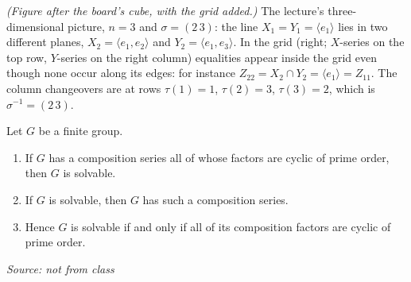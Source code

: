 \documentclass[11pt]{report}
\newcommand{\srcline}[1]{\par\hfill{\footnotesize\textit{Source: #1}}}
\begin{document}
\textit{(Figure after the board's cube, with the grid added.)} The lecture's three-dimensional picture, $n = 3$ and $\sigma = (2\,3)$: the line $X_1 = Y_1 = \langle e_1 \rangle$ lies in two different planes, $X_2 = \langle e_1, e_2 \rangle$ and $Y_2 = \langle e_1, e_3 \rangle$. In the grid (right; $X$-series on the top row, $Y$-series on the right column) equalities appear inside the grid even though none occur along its edges: for instance $Z_{22} = X_2 \cap Y_2 = \langle e_1 \rangle = Z_{11}$. The column changeovers are at rows $\tau(1) = 1$, $\tau(2) = 3$, $\tau(3) = 2$, which is $\sigma^{-1} = (2\,3)$.

\begin{propbox}\label{prop:solvable-iff-prime-composition-factors}
Let $G$ be a finite group.
\begin{enumerate}
    \item If $G$ has a composition series all of whose factors are cyclic of prime order, then $G$ is solvable.
    \item If $G$ is solvable, then $G$ has such a composition series.
    \item Hence $G$ is solvable if and only if all of its composition factors are cyclic of prime order.
\end{enumerate}
\srcline{not from class}
\end{propbox}
\end{document}
